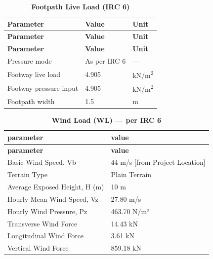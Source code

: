 \documentclass[12pt,a4paper]{report}
\numberwithin{table}{chapter}
\numberwithin{figure}{chapter}
\newcommand{\ReportTableRowGap}{6pt}
\begin{document}
\vspace{0.6em}
\begin{longtable}{|L{7.1cm}|p{6.5cm}|C{2.0cm}|}
\caption{\textbf{Footpath Live Load (IRC 6)}}\\
\hline
\textbf{Parameter} & \textbf{Value} & \textbf{Unit} \\
\hline
\endfirsthead
\hline
\textbf{Parameter} & \textbf{Value} & \textbf{Unit} \\
\hline
\endhead

\endfirsthead
\hline
\textbf{Parameter} & \textbf{Value} & \textbf{Unit} \\
\hline
\endhead
\textnormal{Pressure mode} & As per IRC 6 & --- \\[\ReportTableRowGap]
\hline
\textnormal{Footway live load} & 4.905 & kN/m\textsuperscript{2} \\[\ReportTableRowGap]
\hline
\textnormal{Footway pressure input} & 4.905 & kN/m\textsuperscript{2} \\[\ReportTableRowGap]
\hline
\textnormal{Footpath width} & 1.5 & m \\[\ReportTableRowGap]
\hline
\end{longtable}

\vspace{1em}
\begin{longtable}{|L{5.5cm}|p{10.0cm}|}
\caption{\textbf{Wind Load (WL) --- per IRC 6}}\\
\hline
\textbf{parameter} & \textbf{value} \\
\hline
\endfirsthead
\hline
\textbf{parameter} & \textbf{value} \\
\hline
\endhead

\textnormal{Basic Wind Speed, Vb} & 44 m/s [from Project Location] \\[\ReportTableRowGap]
\hline
\textnormal{Terrain Type} & Plain Terrain \\[\ReportTableRowGap]
\hline
\textnormal{Average Exposed Height, H (m)} & 10 m \\[\ReportTableRowGap]
\hline
\textnormal{Hourly Mean Wind Speed, Vz} & 27.80 m/s \\[\ReportTableRowGap]
\hline
\textnormal{Hourly Wind Pressure, Pz} & 463.70 N/m² \\[\ReportTableRowGap]
\hline
\textnormal{Transverse Wind Force} & 14.43 kN \\[\ReportTableRowGap]
\hline
\textnormal{Longitudinal Wind Force} & 3.61 kN \\[\ReportTableRowGap]
\hline
\textnormal{Vertical Wind Force} & 859.18 kN \\[\ReportTableRowGap]
\hline
\end{longtable}
\end{document}
